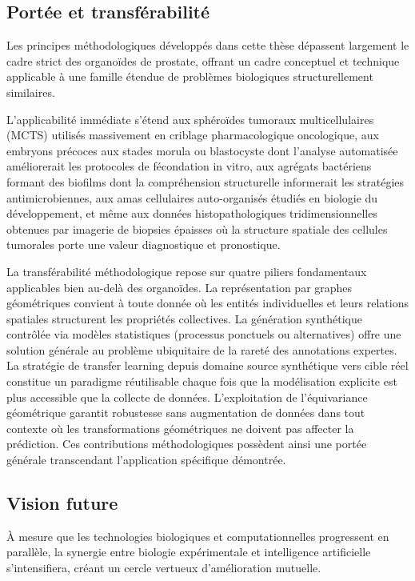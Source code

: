 \subsection{Portée et transférabilité}

Les principes méthodologiques développés dans cette thèse dépassent largement le cadre strict des organoïdes de prostate, offrant un cadre conceptuel et technique applicable à une famille étendue de problèmes biologiques structurellement similaires.

L'applicabilité immédiate s'étend aux sphéroïdes tumoraux multicellulaires (MCTS) utilisés massivement en criblage pharmacologique oncologique, aux embryons précoces aux stades morula ou blastocyste dont l'analyse automatisée améliorerait les protocoles de fécondation in vitro, aux agrégats bactériens formant des biofilms dont la compréhension structurelle informerait les stratégies antimicrobiennes, aux amas cellulaires auto-organisés étudiés en biologie du développement, et même aux données histopathologiques tridimensionnelles obtenues par imagerie de biopsies épaisses où la structure spatiale des cellules tumorales porte une valeur diagnostique et pronostique.

La transférabilité méthodologique repose sur quatre piliers fondamentaux applicables bien au-delà des organoïdes. La représentation par graphes géométriques convient à toute donnée où les entités individuelles et leurs relations spatiales structurent les propriétés collectives. La génération synthétique contrôlée via modèles statistiques (processus ponctuels ou alternatives) offre une solution générale au problème ubiquitaire de la rareté des annotations expertes. La stratégie de transfer learning depuis domaine source synthétique vers cible réel constitue un paradigme réutilisable chaque fois que la modélisation explicite est plus accessible que la collecte de données. L'exploitation de l'équivariance géométrique garantit robustesse sans augmentation de données dans tout contexte où les transformations géométriques ne doivent pas affecter la prédiction. Ces contributions méthodologiques possèdent ainsi une portée générale transcendant l'application spécifique démontrée.

\subsection{Vision future}

À mesure que les technologies biologiques et computationnelles progressent en parallèle, la synergie entre biologie expérimentale et intelligence artificielle s'intensifiera, créant un cercle vertueux d'amélioration mutuelle.

